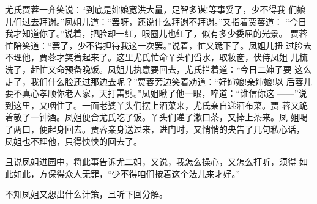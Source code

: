 尤氏贾蓉一齐笑说：“到底是婶娘宽洪大量，足智多谋!等事妥了，少不得我
们娘儿们过去拜谢。”凤姐儿道：“罢呀，还说什么拜谢不拜谢。”又指着贾蓉道：
“今日我才知道你了。”说着，把脸却一红，眼圈儿也红了，似有多少委屈的光景。
贾蓉忙陪笑道：“罢了，少不得担待我这一次罢。”说着，忙又跪下了。凤姐儿扭
过脸去不理他，贾蓉才笑着起来了。这里尤氏忙命丫头们舀水，取妆奁，伏侍凤姐
儿梳洗了，赶忙又命预备晚饭。凤姐儿执意要回去，尤氏拦着道：“今日二婶子要
这么走了，我们什么脸还过那边去呢？”贾蓉旁边笑着劝道：“好婶娘!亲婶娘!以
后蓉儿要不真心孝顺你老人家，天打雷劈。”凤姐瞅了他一眼，啐道：“谁信你这
——”说到这里，又咽住了。一面老婆丫头们摆上酒菜来，尤氏亲自递酒布菜。贾
蓉又跪着敬了一钟酒。凤姐便合尤氏吃了饭。丫头们递了漱口茶，又捧上茶来。凤
姐喝了两口，便起身回去。贾蓉亲身送过来，进门时，又悄悄的央告了几句私心话，
凤姐也不理他，只得怏怏的回去了。

且说凤姐进园中，将此事告诉尤二姐，又说，我怎么操心，又怎么打听，须得
如此如此，方保得众人无罪，“少不得咱们按着这个法儿来才好。”

不知凤姐又想出什么计策，且听下回分解。